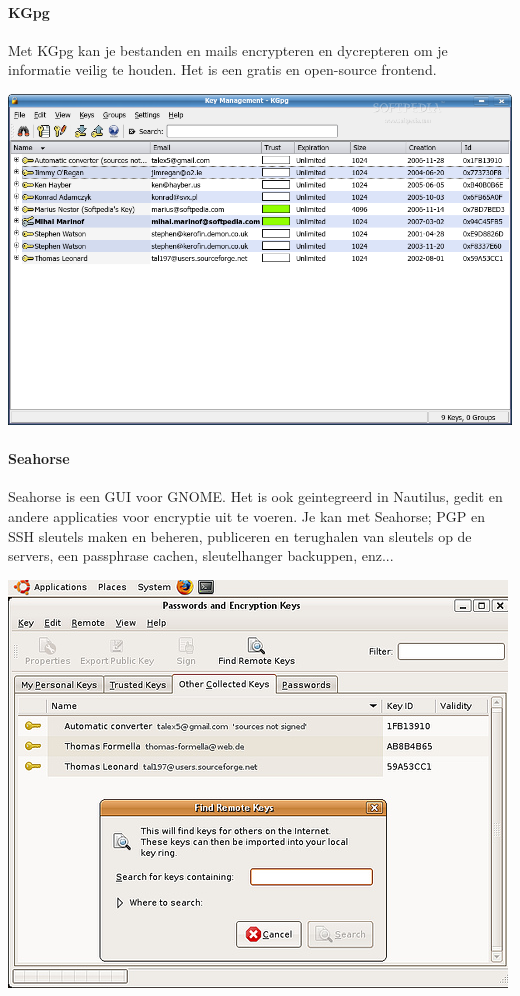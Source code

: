 \documentclass[12pt]{article}
\begin{document}
\paragraph{KGpg}
Met KGpg kan je bestanden en mails encrypteren en dycrepteren om je informatie veilig te houden.
Het is een gratis en open-source frontend.
\begin{center}
\includegraphics[scale=0.3]{Pictures/kgpg}
\end{center}

\paragraph{Seahorse}
Seahorse is een GUI voor GNOME. Het is ook geintegreerd in Nautilus, gedit en andere applicaties voor encryptie uit te voeren.
Je kan met Seahorse; PGP en SSH sleutels maken en beheren, publiceren en terughalen van sleutels op de servers, een passphrase cachen, sleutelhanger backuppen, enz...
\begin{center}
\includegraphics[scale=0.5]{Pictures/Seahorse}
\end{center}
\end{document}
